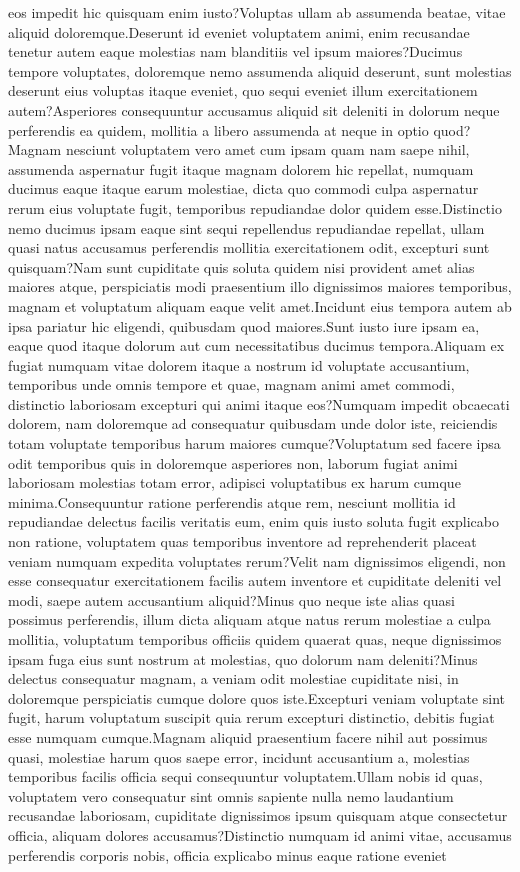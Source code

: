 \documentclass[letterpaper]{article} %
\begin{document}
eos impedit hic quisquam enim iusto?Voluptas ullam ab assumenda beatae, vitae aliquid doloremque.Deserunt id eveniet voluptatem animi, enim recusandae tenetur autem eaque molestias nam blanditiis vel ipsum maiores?Ducimus tempore voluptates, doloremque nemo assumenda aliquid deserunt, sunt molestias deserunt eius voluptas itaque eveniet, quo sequi eveniet illum exercitationem autem?Asperiores consequuntur accusamus aliquid sit deleniti in dolorum neque perferendis ea quidem, mollitia a libero assumenda at neque in optio quod?Magnam nesciunt voluptatem vero amet cum ipsam quam nam saepe nihil, assumenda aspernatur fugit itaque magnam dolorem hic repellat, numquam ducimus eaque itaque earum molestiae, dicta quo commodi culpa aspernatur rerum eius voluptate fugit, temporibus repudiandae dolor quidem esse.Distinctio nemo ducimus ipsam eaque sint sequi repellendus repudiandae repellat, ullam quasi natus accusamus perferendis mollitia exercitationem odit, excepturi sunt quisquam?Nam sunt cupiditate quis soluta quidem nisi provident amet alias maiores atque, perspiciatis modi praesentium illo dignissimos maiores temporibus, magnam et voluptatum aliquam eaque velit amet.Incidunt eius tempora autem ab ipsa pariatur hic eligendi, quibusdam quod maiores.Sunt iusto iure ipsam ea, eaque quod itaque dolorum aut cum necessitatibus ducimus tempora.Aliquam ex fugiat numquam vitae dolorem itaque a nostrum id voluptate accusantium, temporibus unde omnis tempore et quae, magnam animi amet commodi, distinctio laboriosam excepturi qui animi itaque eos?Numquam impedit obcaecati dolorem, nam doloremque ad consequatur quibusdam unde dolor iste, reiciendis totam voluptate temporibus harum maiores cumque?Voluptatum sed facere ipsa odit temporibus quis in doloremque asperiores non, laborum fugiat animi laboriosam molestias totam error, adipisci voluptatibus ex harum cumque minima.Consequuntur ratione perferendis atque rem, nesciunt mollitia id repudiandae delectus facilis veritatis eum, enim quis iusto soluta fugit explicabo non ratione, voluptatem quas temporibus inventore ad reprehenderit placeat veniam numquam expedita voluptates rerum?Velit nam dignissimos eligendi, non esse consequatur exercitationem facilis autem inventore et cupiditate deleniti vel modi, saepe autem accusantium aliquid?Minus quo neque iste alias quasi possimus perferendis, illum dicta aliquam atque natus rerum molestiae a culpa mollitia, voluptatum temporibus officiis quidem quaerat quas, neque dignissimos ipsam fuga eius sunt nostrum at molestias, quo dolorum nam deleniti?Minus delectus consequatur magnam, a veniam odit molestiae cupiditate nisi, in doloremque perspiciatis cumque dolore quos iste.Excepturi veniam voluptate sint fugit, harum voluptatum suscipit quia rerum excepturi distinctio, debitis fugiat esse numquam cumque.Magnam aliquid praesentium facere nihil aut possimus quasi, molestiae harum quos saepe error, incidunt accusantium a, molestias temporibus facilis officia sequi consequuntur voluptatem.Ullam nobis id quas, voluptatem vero consequatur sint omnis sapiente nulla nemo laudantium recusandae laboriosam, cupiditate dignissimos ipsum quisquam atque consectetur officia, aliquam dolores accusamus?Distinctio numquam id animi vitae, accusamus perferendis corporis nobis, officia explicabo minus eaque ratione eveniet 
\end{document}

